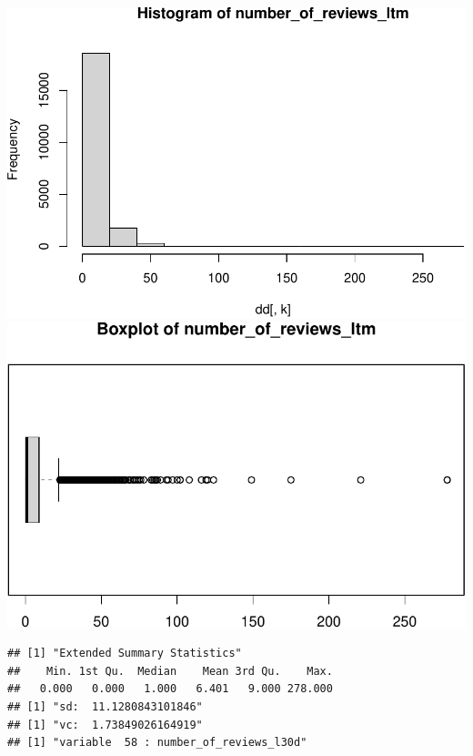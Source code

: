 \includegraphics{anal_files/figure-latex/unnamed-chunk-7-42.pdf}
\includegraphics{anal_files/figure-latex/unnamed-chunk-7-43.pdf}

\begin{verbatim}
## [1] "Extended Summary Statistics"
##    Min. 1st Qu.  Median    Mean 3rd Qu.    Max. 
##   0.000   0.000   1.000   6.401   9.000 278.000 
## [1] "sd:  11.1280843101846"
## [1] "vc:  1.73849026164919"
## [1] "variable  58 : number_of_reviews_l30d"
\end{verbatim}

